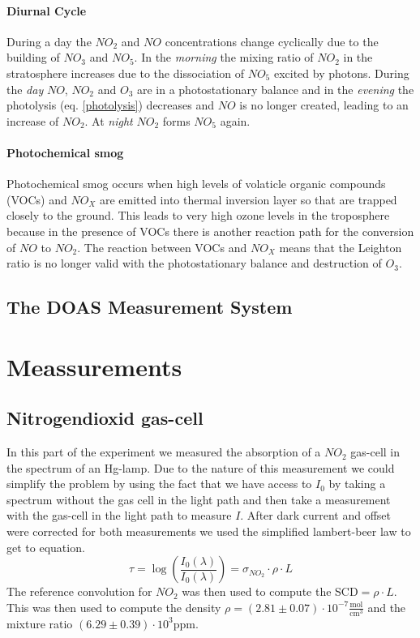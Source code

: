 \documentclass[12pt, english]{scrartcl} %
\begin{document}
\begin{multicols}{2}
\paragraph{Diurnal Cycle}
During a day the $NO_2$ and $NO$ concentrations change cyclically due to the building of $NO_3$ and $NO_5$. In the \textit{morning} the mixing ratio of $NO_2$ in the stratosphere increases due to the dissociation of $NO_5$ excited by photons. During the \textit{day} $NO$, $NO_2$ and $O_3$ are in a photostationary balance and in the \textit{evening} the photolysis (eq. \ref{photolysis}) decreases and $NO$ is no longer created, leading to an increase of $NO_2$. At \textit{night} $NO_2$ forms $NO_5$ again.
\paragraph{Photochemical smog}
Photochemical smog occurs when high levels of volaticle organic compounds (VOCs) and $NO_X$ are emitted into thermal inversion layer so that are trapped closely to the ground. This leads to very high ozone levels in the troposphere because in the presence of VOCs there is another reaction path for the conversion of $NO$ to $NO_2$. The reaction between VOCs and $NO_X$ means that the Leighton ratio is no longer valid with the photostationary balance and destruction of $O_3$. 

 \subsection{The DOAS Measurement System}

\newpage
\section{Meassurements}
\subsection{Nitrogendioxid gas-cell}
In this part of the experiment we measured the absorption of a $NO_2$ gas-cell in the spectrum of an Hg-lamp. Due to the nature of this measurement we could simplify the problem by using the fact that we have access to $I_0$ by taking a spectrum without the gas cell in the light path and then take a measurement with the gas-cell in the light path to measure $I$. After dark current and offset were corrected for both measurements we used the simplified lambert-beer law to get to equation.
\begin{equation}
\tau = \log(\frac{I_0(\lambda)}{I_0(\lambda)})= \sigma_{NO_2} \cdot \rho \cdot L
\end{equation}
The reference convolution for $NO_2$ was then used to compute the SCD$= \rho \cdot L$. This was then used to compute the density $\rho = (2.81 \pm 0.07 ) \cdot 10^{-7} \frac{\text{mol}}{\text{cm}^3}$ and the mixture ratio $(6.29 \pm 0.39) \cdot 10^3 \text{ppm}$.

\end{multicols}
\end{document}
